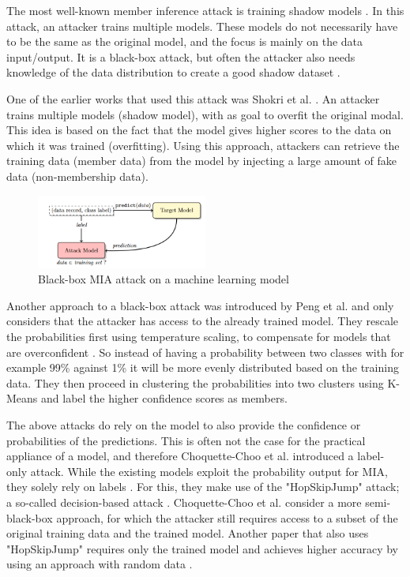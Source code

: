 The most well-known member inference attack is training shadow models \citep{rigaki_survey_2021}.
In this attack, an attacker trains multiple models.
These models do not necessarily have to be the same as the original model, and the focus is mainly on the data input/output.
It is a black-box attack, but often the attacker also needs knowledge of the data distribution to create a good shadow dataset \citep{rigaki_survey_2021}.

One of the earlier works that used this attack was Shokri et al. \citep{shokri_membership_2017}.
An attacker trains multiple models (shadow model), with as goal to overfit the original modal.
This idea is based on the fact that the model gives higher scores to the data on which it was trained (overfitting).
Using this approach, attackers can retrieve the training data (member data) from the model by injecting a large amount of fake data (non-membership data).
\begin{figure}[H]
  \includegraphics[width=0.5\textwidth]{TheorethicalFramework/AttacksOnPrivacy/shadow-models-mi.png}
  \caption{Black-box MIA attack on a machine learning model \citep{shokri_membership_2017}}
\end{figure}
Another approach to a black-box attack was introduced by Peng et al. and only considers that the attacker has access to the already trained model.
They rescale the probabilities first using temperature scaling, to compensate for models that are overconfident \citep{peng_unsupervised_nodate}.
So instead of having a probability between two classes with for example 99\% against 1\% it will be more evenly distributed based on the training data.
They then proceed in clustering the probabilities into two clusters using K-Means and label the higher confidence scores as members.

The above attacks do rely on the model to also provide the confidence or probabilities of the predictions.
This is often not the case for the practical appliance of a model, and therefore Choquette-Choo et al. introduced a label-only attack.
While the existing models exploit the probability output for MIA, they solely rely on labels \citep{choquette-choo_label-only_2021}.
For this, they make use of the "HopSkipJump" attack; a so-called decision-based attack \citep{chen_hopskipjumpattack_2020}.
Choquette-Choo et al. consider a more semi-black-box approach, for which the attacker still requires access to a subset of the original training data and the trained model.
Another paper that also uses "HopSkipJump" requires only the trained model and achieves higher accuracy by using an approach with random data \citep{li_membership_2021}. \newline

